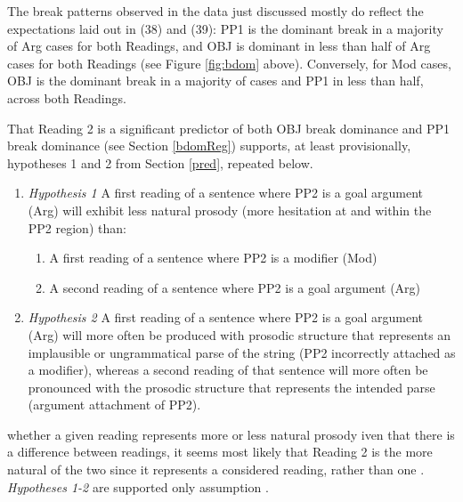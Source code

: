 \documentclass[12pt,oneside]{book}
\providecommand{\tightlist}{%
  \setlength{\itemsep}{0pt}\setlength{\parskip}{0pt}}
\begin{document}
\doublespacing

The break patterns observed in the data just discussed mostly do reflect the expectations laid out in (38) and (39): PP1 is the dominant break in a majority of Arg cases for both Readings, and OBJ is dominant in less than half of Arg cases for both Readings (see Figure \ref{fig:bdom} above). Conversely, for Mod cases, OBJ is the dominant break in a majority of cases and PP1 in less than half, across both Readings.

That Reading 2 is a significant predictor of both OBJ break dominance and PP1 break dominance (see Section \ref{bdomReg}) supports, at least provisionally, hypotheses 1 and 2 from Section \ref{pred}, repeated below.

\begin{enumerate}
\def\labelenumi{(\arabic{enumi})}
\setcounter{enumi}{39}
\tightlist
\item
  \emph{Hypothesis 1} \linebreak\nopagebreak
  A first reading of a sentence where PP2 is a goal argument (Arg) will exhibit less natural prosody (more hesitation at and within the PP2 region) than:

  \begin{enumerate}
  \def\labelenumii{\alph{enumii}.}
  \tightlist
  \item
    A first reading of a sentence where PP2 is a modifier (Mod)
  \item
    A second reading of a sentence where PP2 is a goal argument (Arg)
  \end{enumerate}
\item
  \emph{Hypothesis 2} \linebreak\nopagebreak
  A first reading of a sentence where PP2 is a goal argument (Arg) will more often be produced with prosodic structure that represents an implausible or ungrammatical parse of the string (PP2 incorrectly attached as a modifier), whereas a second reading of that sentence will more often be pronounced with the prosodic structure that represents the intended parse (argument attachment of PP2).
\end{enumerate}

 whether a given reading represents more or less natural prosody iven that there is a difference between readings, it seems most likely that Reading 2 is the more natural of the two since it represents a considered reading, rather than  one . \emph{Hypotheses 1-2} are supported only  assumption .
\end{document}
